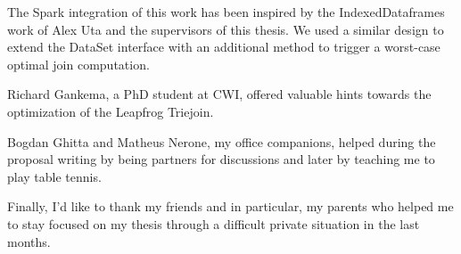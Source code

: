 \documentclass[11pt]{article}
\begin{document}
The Spark integration of this work has been inspired by the IndexedDataframes~\cite{indexed-dataframes} work of Alex Uta and the supervisors
of this thesis.
We used a similar design to extend the DataSet interface with an additional method to trigger a worst-case optimal join computation.

Richard Gankema, a PhD student at CWI, offered valuable hints towards the optimization of the Leapfrog Triejoin.

Bogdan Ghitta and Matheus Nerone, my office companions, helped during the proposal writing by being partners for discussions and later
by teaching me to play table tennis.

Finally, I'd like to thank my friends and in particular, my parents who helped me to stay focused on my thesis through a difficult private
situation in the last months.

\newpage
\tableofcontents
\newpage










\clearpage

\printbibliography
\clearpage


\end{document}
